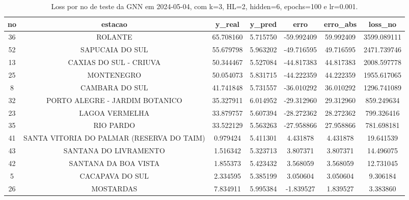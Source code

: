 \begin{table}[h]
\centering
\caption{Loss por no de teste da GNN em 2024-05-04, com k=3, HL=2, hidden=6, epochs=100 e lr=0.001.}
\label{tab:gnn_loss_k3_hl2_h6_e100_d20240504}
\begin{tabular}{ccccccc}
\toprule
no & estacao & y\_real & y\_pred & erro & erro\_abs & loss\_no \\
\midrule
36 & ROLANTE & 65.708160 & 5.715750 & -59.992409 & 59.992409 & 3599.089111 \\
52 & SAPUCAIA DO SUL & 55.679798 & 5.963202 & -49.716595 & 49.716595 & 2471.739746 \\
13 & CAXIAS DO SUL - CRIUVA & 50.344467 & 5.527084 & -44.817383 & 44.817383 & 2008.597778 \\
25 & MONTENEGRO & 50.054073 & 5.831715 & -44.222359 & 44.222359 & 1955.617065 \\
8 & CAMBARA DO SUL & 41.741848 & 5.731557 & -36.010292 & 36.010292 & 1296.741089 \\
32 & PORTO ALEGRE - JARDIM BOTANICO & 35.327911 & 6.014952 & -29.312960 & 29.312960 & 859.249634 \\
23 & LAGOA VERMELHA & 33.879757 & 5.607394 & -28.272362 & 28.272362 & 799.326416 \\
35 & RIO PARDO & 33.522129 & 5.563263 & -27.958866 & 27.958866 & 781.698181 \\
41 & SANTA VITORIA DO PALMAR (RESERVA DO TAIM) & 0.979424 & 5.411301 & 4.431878 & 4.431878 & 19.641539 \\
43 & SANTANA DO LIVRAMENTO & 1.516342 & 5.323713 & 3.807371 & 3.807371 & 14.496075 \\
42 & SANTANA DA BOA VISTA & 1.855373 & 5.423432 & 3.568059 & 3.568059 & 12.731045 \\
5 & CACAPAVA DO SUL & 2.334595 & 5.385199 & 3.050604 & 3.050604 & 9.306184 \\
26 & MOSTARDAS & 7.834911 & 5.995384 & -1.839527 & 1.839527 & 3.383860 \\
\bottomrule
\end{tabular}
\end{table}
